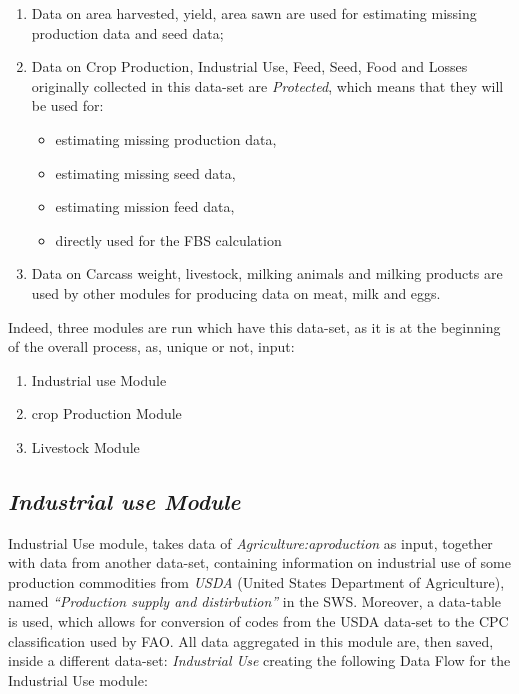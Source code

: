 \documentclass[]{article}
\providecommand{\tightlist}{%
  \setlength{\itemsep}{0pt}\setlength{\parskip}{0pt}}
\begin{document}
\begin{enumerate}
\def\labelenumi{\arabic{enumi}.}
\tightlist
\item
  Data on area harvested, yield, area sawn are used for estimating
  missing production data and seed data;
\item
  Data on Crop Production, Industrial Use, Feed, Seed, Food and Losses
  originally collected in this data-set are \emph{Protected}, which
  means that they will be used for:

  \begin{itemize}
  \tightlist
  \item
    estimating missing production data,
  \item
    estimating missing seed data,
  \item
    estimating mission feed data,
  \item
    directly used for the FBS calculation
  \end{itemize}
\item
  Data on Carcass weight, livestock, milking animals and milking
  products are used by other modules for producing data on meat, milk
  and eggs.
\end{enumerate}

Indeed, three modules are run which have this data-set, as it is at the
beginning of the overall process, as, unique or not, input:

\begin{enumerate}
\def\labelenumi{\arabic{enumi}.}
\tightlist
\item
  Industrial use Module
\item
  crop Production Module
\item
  Livestock Module
\end{enumerate}

\subsection{\texorpdfstring{\emph{Industrial use
Module}}{Industrial use Module}}\label{industrial-use-module}

Industrial Use module, takes data of \emph{Agriculture:aproduction} as
input, together with data from another data-set, containing information
on industrial use of some production commodities from \emph{USDA}
(United States Department of Agriculture), named \emph{``Production
supply and distirbution''} in the SWS. Moreover, a data-table is used,
which allows for conversion of codes from the USDA data-set to the CPC
classification used by FAO. All data aggregated in this module are, then
saved, inside a different data-set: \emph{Industrial Use} creating the
following Data Flow for the Industrial Use module:
\end{document}
